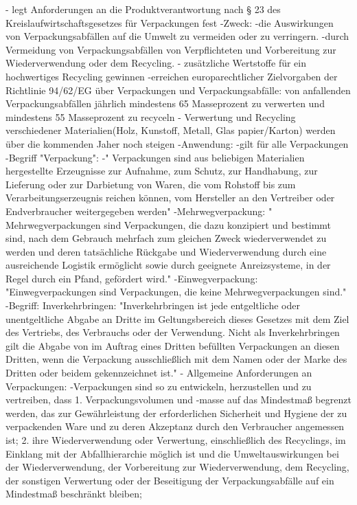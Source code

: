 - legt Anforderungen an die Produktverantwortung nach § 23 des Kreislaufwirtschaftsgesetzes
für Verpackungen fest
-Zweck: 
    -die Auswirkungen von Verpackungsabfällen auf die Umwelt zu vermeiden oder zu verringern.
    -durch Vermeidung von Verpackungsabfällen von Verpflichteten und Vorbereitung zur Wiederverwendung oder dem Recycling. 
    - zusätzliche Wertstoffe für ein hochwertiges Recycling gewinnen
    -erreichen europarechtlicher Zielvorgaben der Richtlinie 94/62/EG über Verpackungen und Verpackungsabfälle: von anfallenden Verpackungsabfällen jährlich mindestens 65 Masseprozent zu verwerten und mindestens 55 Masseprozent zu recyceln
        - Verwertung und Recycling verschiedener Materialien(Holz, Kunstoff, Metall, Glas papier/Karton) werden über die kommenden Jaher noch steigen
-Anwendung: 
    -gilt für alle Verpackungen
-Begriff "Verpackung":
    -" Verpackungen sind aus beliebigen Materialien hergestellte Erzeugnisse zur Aufnahme, zum Schutz, zur Handhabung, zur Lieferung oder zur Darbietung von Waren, die vom Rohstoff bis zum Verarbeitungserzeugnis reichen können, vom Hersteller an den Vertreiber oder Endverbraucher weitergegeben werden"
    -Mehrwegverpackung: " Mehrwegverpackungen sind Verpackungen, die dazu konzipiert und bestimmt sind, nach dem Gebrauch mehrfach zum gleichen Zweck wiederverwendet zu werden und deren tatsächliche Rückgabe und Wiederverwendung durch eine ausreichende Logistik ermöglicht sowie durch geeignete Anreizsysteme, in der Regel durch ein Pfand, gefördert wird."
    -Einwegverpackung: "Einwegverpackungen sind Verpackungen, die keine Mehrwegverpackungen sind."
-Begriff: Inverkehrbringen:
     "Inverkehrbringen ist jede entgeltliche oder unentgeltliche Abgabe an Dritte im Geltungsbereich dieses Gesetzes mit dem Ziel des Vertriebs, des Verbrauchs oder der Verwendung. Nicht als Inverkehrbringen gilt die Abgabe von im Auftrag eines Dritten befüllten Verpackungen an diesen Dritten, wenn die Verpackung ausschließlich mit dem Namen oder der Marke des Dritten oder beidem gekennzeichnet ist."
    - Allgemeine Anforderungen an Verpackungen:
        -Verpackungen sind so zu entwickeln, herzustellen und zu vertreiben, dass
            1. Verpackungsvolumen und -masse auf das Mindestmaß begrenzt werden, das zur Gewährleistung der erforderlichen Sicherheit und Hygiene der zu verpackenden Ware und zu deren Akzeptanz durch den Verbraucher angemessen ist;
            2. ihre Wiederverwendung oder Verwertung, einschließlich des Recyclings, im Einklang mit der Abfallhierarchie möglich ist und die Umweltauswirkungen bei der Wiederverwendung, der Vorbereitung zur Wiederverwendung, dem Recycling, der sonstigen Verwertung oder der Beseitigung der Verpackungsabfälle auf ein Mindestmaß beschränkt bleiben;
